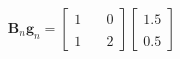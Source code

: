 \documentclass[preview]{standalone}
\begin{document}
\begin{align*}
\begin{align} \mathbf{B}_n \mathbf{g}_n = \begin{bmatrix} 1 & \quad 0 \\ \\1 & \quad 2 \end{bmatrix}\begin{bmatrix} 1.5 \\ \\ 0.5 \end{bmatrix} \end{align}
\end{align*}
\end{document}
